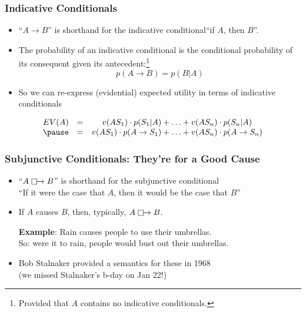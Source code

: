 \begin{frame}
\frametitle{Indicative Conditionals}

\begin{itemize}[<+->]

\item ``$A \rightarrow B$'' is shorthand for the indicative conditional``if $A$, then $B$''.


\item The probability of an indicative conditional is the conditional probability of its consequent given its antecedent:\footnote{Provided that $A$ contains no indicative conditionals.}
$$p(A \rightarrow B) = p(B|A)$$

\item So we can re-express (evidential) expected utility in terms of indicative conditionals \pause
\end{itemize} 

\[
\begin{array}{ccc}
EV(A) &= &v(A S_1) \cdot p(S_1|{}A) + \ldots + v(A S_n) \cdot p(S_n|{}A)\\ \pause 
& = & v(A S_1) \cdot p(A \rightarrow S_1) + \ldots + v(A S_n) \cdot p(A \rightarrow S_n)
\end{array}
\]


\end{frame}

\begin{frame}
\frametitle{Subjunctive Conditionals: They're for a Good Cause}

\begin{itemize}[<+->]
\item ``$A \mathrel{\mathop\Box}\mathrel{\mkern-2.5mu}\rightarrow B$'' is shorthand for the subjunctive conditional \\ ``If it were the case that $A$, then it would be the case that $B$''

\item If $A$ causes $B$, then, typically, $A \mathrel{\mathop\Box}\mathrel{\mkern-2.5mu}\rightarrow B$. 

\textbf{Example}: Rain causes people to use their umbrellas. \\ So: were it to rain, people would bust out their umbrellas.

\item Bob Stalnaker provided a semantics for these in 1968 \\ (we missed Stalnaker's b-day on Jan 22!) 



\end{itemize}
\end{frame}


